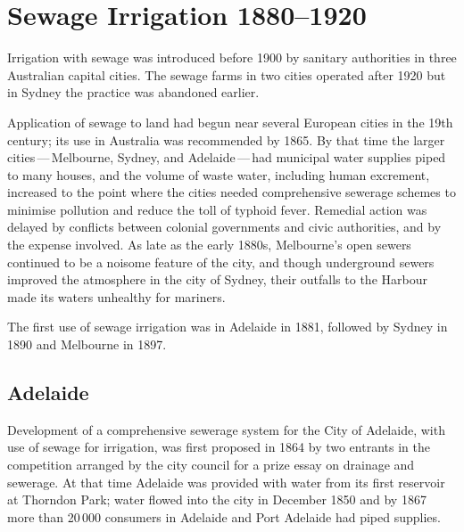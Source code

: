 
\setcounter{endnote}{0}

\chapter{Sewage Irrigation 1880--1920}
\label{ch:sewage}


Irrigation with sewage was introduced before 1900 by sanitary
authorities in three Australian capital cities.  The sewage farms in
two cities operated after 1920 but in Sydney the practice was
abandoned earlier.

Application of sewage to land had begun near several European cities
in the 19th century; its use in Australia was recommended by 1865.  By
that time the larger cities\,---\,Melbourne, Sydney, and
Adelaide\,---\,had municipal water supplies piped to many houses, and
the volume of waste water, including human excrement, increased to the
point where the cities needed comprehensive sewerage schemes to
minimise pollution and reduce the toll of typhoid fever.  Remedial
action was delayed by conflicts between colonial governments and civic
authorities, and by the expense involved.  As late as the early 1880s,
Melbourne's open sewers continued to be a noisome feature of the city,
and though underground sewers improved the atmosphere in the city of
Sydney, their outfalls to the Harbour made its waters unhealthy for
mariners.

The first use of sewage irrigation was in Adelaide in 1881, followed
by Sydney in 1890 and Melbourne in 1897.

\section*{Adelaide}

Development of a comprehensive sewerage system for the City of
Adelaide, with use of sewage for irrigation, was first proposed in
1864 by two entrants in the competition arranged by the city council
for a prize essay on drainage and sewerage.  At that time Adelaide was
provided with water from its first reservoir at Thorndon Park;
 water flowed into the city in
December 1850 and by 1867 more than 20\,000 consumers in Adelaide and
Port Adelaide had piped
supplies.

